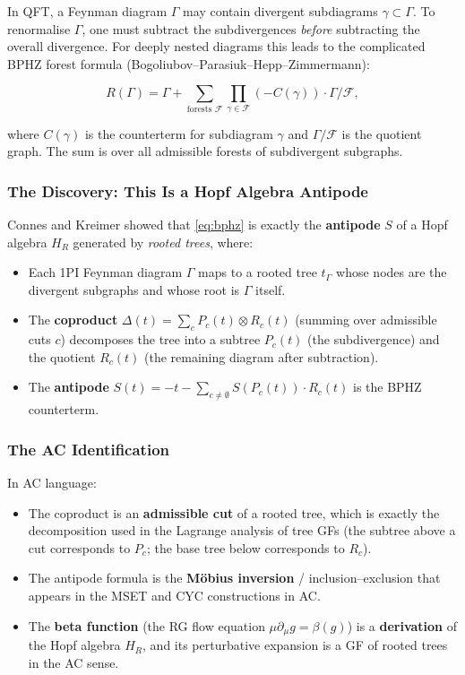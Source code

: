 \documentclass[11pt,a4paper]{article}
\theoremstyle{definition}
\begin{document}
In QFT, a Feynman diagram $\Gamma$ may contain divergent subdiagrams
$\gamma \subset \Gamma$. To renormalise $\Gamma$, one must subtract the
subdivergences \emph{before} subtracting the overall divergence. For
deeply nested diagrams this leads to the complicated BPHZ forest formula
(Bogoliubov--Parasiuk--Hepp--Zimmermann):

\begin{equation}
  R(\Gamma) = \Gamma + \sum_{\text{forests } \mathcal{F}} \prod_{\gamma \in \mathcal{F}}
  (-C(\gamma)) \cdot \Gamma/\mathcal{F},
  \label{eq:bphz}
\end{equation}

where $C(\gamma)$ is the counterterm for subdiagram $\gamma$ and
$\Gamma/\mathcal{F}$ is the quotient graph. The sum is over all admissible
forests of subdivergent subgraphs.

\subsubsection{The Discovery: This Is a Hopf Algebra Antipode}

Connes and Kreimer \cite{conneskreimer1998} showed that \eqref{eq:bphz}
is exactly the \textbf{antipode} $S$ of a Hopf algebra $H_R$ generated
by \emph{rooted trees}, where:

\begin{itemize}[leftmargin=2em]
  \item Each 1PI Feynman diagram $\Gamma$ maps to a rooted tree $t_\Gamma$
        whose nodes are the divergent subgraphs and whose root is $\Gamma$ itself.
  \item The \textbf{coproduct} $\Delta(t) = \sum_c P_c(t) \otimes R_c(t)$
        (summing over admissible cuts $c$) decomposes the tree into a
        subtree $P_c(t)$ (the subdivergence) and the quotient $R_c(t)$
        (the remaining diagram after subtraction).
  \item The \textbf{antipode} $S(t) = -t - \sum_{c \neq \emptyset} S(P_c(t))\cdot R_c(t)$
        is the BPHZ counterterm.
\end{itemize}

\subsubsection{The AC Identification}

In AC language:
\begin{itemize}[leftmargin=2em]
  \item The coproduct is an \textbf{admissible cut} of a rooted tree, which
        is exactly the decomposition used in the Lagrange analysis of tree GFs
        (the subtree above a cut corresponds to $P_c$; the base tree below
        corresponds to $R_c$).
  \item The antipode formula is the \textbf{M\"obius inversion} / inclusion--exclusion
        that appears in the MSET and CYC constructions in AC.
  \item The \textbf{beta function} (the RG flow equation $\mu\partial_\mu g = \beta(g)$)
        is a \textbf{derivation} of the Hopf algebra $H_R$, and its perturbative
        expansion is a GF of rooted trees in the AC sense.
\end{itemize}
\end{document}

